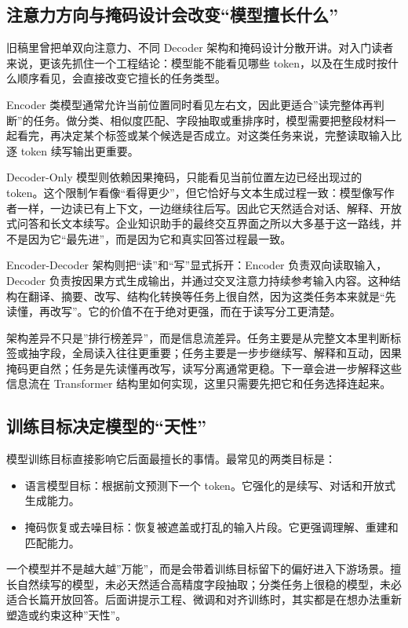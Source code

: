 \subsection{注意力方向与掩码设计会改变“模型擅长什么”}
旧稿里曾把单双向注意力、不同 Decoder 架构和掩码设计分散开讲。对入门读者来说，更该先抓住一个工程结论：模型能不能看见哪些 token，以及在生成时按什么顺序看见，会直接改变它擅长的任务类型。

Encoder 类模型通常允许当前位置同时看见左右文，因此更适合”读完整体再判断”的任务。做分类、相似度匹配、字段抽取或重排序时，模型需要把整段材料一起看完，再决定某个标签或某个候选是否成立。对这类任务来说，完整读取输入比逐 token 续写输出更重要。

Decoder-Only 模型则依赖因果掩码，只能看见当前位置左边已经出现过的 token。这个限制乍看像“看得更少”，但它恰好与文本生成过程一致：模型像写作者一样，一边读已有上下文，一边继续往后写。因此它天然适合对话、解释、开放式问答和长文本续写。企业知识助手的最终交互界面之所以大多基于这一路线，并不是因为它“最先进”，而是因为它和真实回答过程最一致。

Encoder-Decoder 架构则把“读”和“写”显式拆开：Encoder 负责双向读取输入，Decoder 负责按因果方式生成输出，并通过交叉注意力持续参考输入内容。这种结构在翻译、摘要、改写、结构化转换等任务上很自然，因为这类任务本来就是“先读懂，再改写”。它的价值不在于绝对更强，而在于读写分工更清楚。

架构差异不只是”排行榜差异”，而是信息流差异。任务主要是从完整文本里判断标签或抽字段，全局读入往往更重要；任务主要是一步步继续写、解释和互动，因果掩码更自然；任务是先读懂再改写，读写分离通常更稳。下一章会进一步解释这些信息流在 Transformer 结构里如何实现，这里只需要先把它和任务选择连起来。

\subsection{训练目标决定模型的“天性”}
模型训练目标直接影响它后面最擅长的事情。最常见的两类目标是：
\begin{itemize}
  \item 语言模型目标：根据前文预测下一个 token。它强化的是续写、对话和开放式生成能力。
  \item 掩码恢复或去噪目标：恢复被遮盖或打乱的输入片段。它更强调理解、重建和匹配能力。
\end{itemize}

一个模型并不是越大越”万能”，而是会带着训练目标留下的偏好进入下游场景。擅长自然续写的模型，未必天然适合高精度字段抽取；分类任务上很稳的模型，未必适合长篇开放回答。后面讲提示工程、微调和对齐训练时，其实都是在想办法重新塑造或约束这种”天性”。

